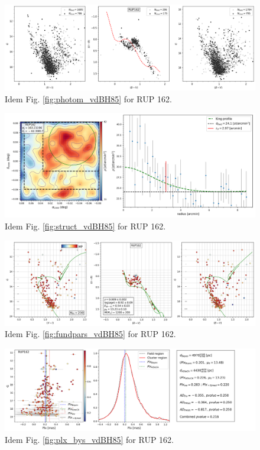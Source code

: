 \documentclass[referee]{aa}
\begin{document}
\begin{figure}[ht]
    \centering
    \includegraphics[width=\hsize]{../figs/obs_RUP162.png}
    \caption{Idem Fig. \ref{fig:photom_vdBH85} for RUP 162.}
    \label{fig47}
\end{figure}
\begin{figure}[ht]
    \centering
    \includegraphics[width=\hsize]{../figs/dmap_rup162.png}
    \caption{Idem Fig. \ref{fig:struct_vdBH85} for RUP 162.}
    \label{fig48}
\end{figure}
\begin{figure}[ht]
    \centering
    \includegraphics[width=\hsize]{../figs/cmds_rup162.png}
    \caption{Idem Fig. \ref{fig:fundpars_vdBH85} for RUP 162.}
    \label{fig49}
\end{figure}
\begin{figure}[ht]
    \centering
    \includegraphics[width=\hsize]{../figs/plx_RUP162.png}
    \caption{Idem Fig. \ref{fig:plx_bys_vdBH85} for RUP 162.}
    \label{fig50}
\end{figure}
\end{document}

